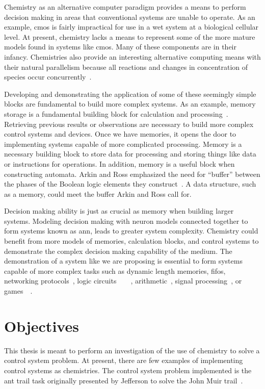Chemistry as an alternative computer paradigm provides a means to perform decision making in areas that conventional  systems are unable to operate. As an example, \gls{cmos} is fairly impractical for use in a wet system at a biological cellular level. At present, chemistry lacks a means to represent some of the more mature models found in systems like \gls{cmos}. Many of these components are in their infancy. Chemistries also provide an interesting alternative computing means with their natural parallelism because all reactions and changes in concentration of species occur concurrently~\cite{De_Lacy_Costello2003-yf}.

Developing and demonstrating the application of some of these seemingly simple blocks are fundamental to build more complex systems. As an example, memory storage is a fundamental building block for calculation and processing~\cite{Kanopoulos1986-of}. Retrieving previous results or observations are necessary to build more complex control systems and devices. Once we have memories, it opens the door to implementing systems capable of more complicated processing. Memory is a necessary building block to store data for processing and storing things like data or instructions for operations. In addition, memory is a useful block when constructing automata. Arkin and Ross emphasized the need for ``buffer''  between the phases of the Boolean logic elements they construct~\cite{Arkin1994-bs}. A data structure, such as a memory, could meet the buffer Arkin and Ross call for.

Decision making ability is just as crucial as memory when building larger systems. Modeling decision making with neuron models connected together to form systems known as \gls{ann}, leads to greater system complexity. Chemistry could benefit from more models of memories, calculation blocks, and control systems to demonstrate the complex decision making capability of the medium. The demonstration of a system like we are proposing is essential to form systems capable of more complex tasks such as dynamic length memories, \glspl{fifo}, networking protocols~\cite{Meyer2011-xn}, logic circuits~\cite{Arkin1994-bs}~\cite{Matsumaru2005-ca}~\cite{Katz2012-fl}~\cite{Banda2013-zs}, arithmetic~\cite{Katz2012-wk}, signal processing~\cite{Jiang2013-gq}, or games~\cite{Stojanovic2003-eg}~\cite{Faulhammer2000-qv}. 

\section{Objectives}
This thesis is meant to perform an investigation of the use of chemistry to solve a control system problem. At present, there are few examples of implementing control systems as chemistries. The control system problem implemented is the ant trail task originally presented by Jefferson to solve the John Muir trail~\cite{Jefferson1992-ph}. 

